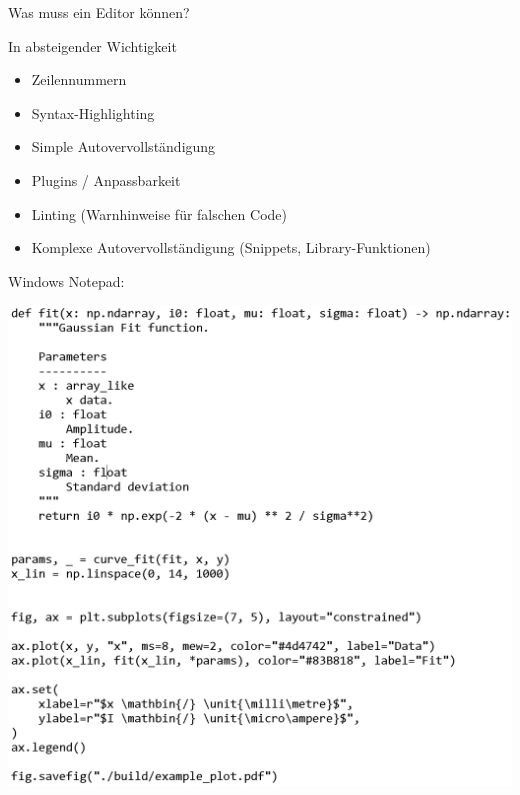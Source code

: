 \begin{frame}{Was muss ein Editor können?}
  \begin{minipage}{0.38\textwidth}
    In absteigender Wichtigkeit

    \begin{itemize}
      \item Zeilennummern
      \item Syntax-Highlighting
      \item Simple Autovervollständigung
      \item Plugins / Anpassbarkeit
      \item Linting (Warnhinweise für falschen Code)
      \item Komplexe Autovervollständigung (Snippets, Library-Funktionen)
    \end{itemize}
    
    \vspace{.4\textheight}
  \end{minipage}
  \pause
  \begin{minipage}{0.22\textwidth}
    Windows Notepad:

    \includegraphics[height=0.52\textheight]{figures/notepad_example_screenshot.png}


\end{minipage}
\end{frame}
